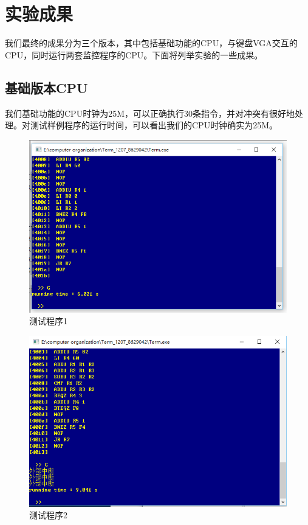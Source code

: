 
\chapter{实验成果} %

\label{Chapter5} %
我们最终的成果分为三个版本，其中包括基础功能的CPU，与键盘VGA交互的CPU，同时运行两套监控程序的CPU。下面将列举实验的一些成果。


\section{基础版本CPU}

我们基础功能的CPU时钟为25M，可以正确执行30条指令，并对冲突有很好地处理。对测试样例程序的运行时间，可以看出我们的CPU时钟确实为25M。

\begin{figure}[H]
  \includegraphics[width=\linewidth]{Figures/cpu1.png}
  \caption{测试程序1}
\end{figure}

\begin{figure}[H]
  \includegraphics[width=\linewidth]{Figures/cpu2.png}
  \caption{测试程序2}
\end{figure}

